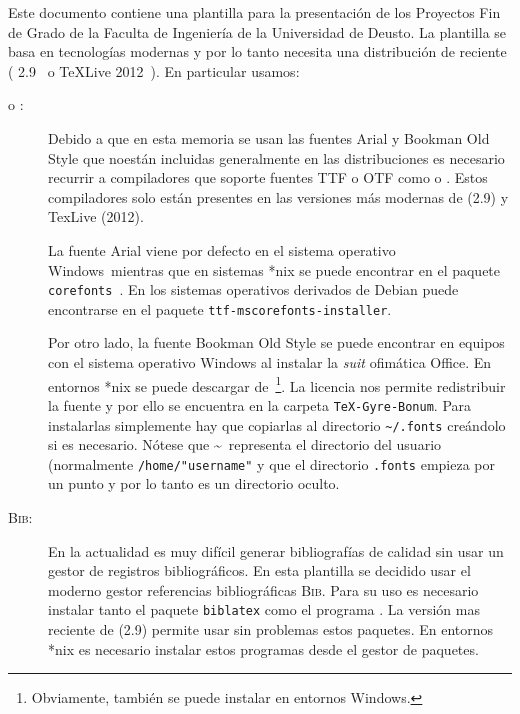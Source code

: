 \documentclass{DeustoFDP}
\begin{document}
Este documento contiene una plantilla para la presentaci\'on de los Proyectos
Fin de Grado de la Faculta de Ingenier\'ia de la Universidad de Deusto. La
plantilla se basa en tecnolog\'ias modernas y por lo tanto necesita una
distribuci\'on de  reciente ( 2.9~\cite{miktex} o
TeXLive 2012~\cite{texlive}). En particular usamos:
\begin{description}
  \item[ o :] Debido a que en esta memoria se
    usan las fuentes Arial y Bookman Old Style que noest\'an incluidas generalmente en
    las distribuciones  es necesario recurrir a compiladores que
    soporte fuentes TTF o OTF como  o .
    Estos compiladores solo est\'an presentes en las versiones m\'as modernas de
     (2.9) y TexLive (2012).

    La fuente Arial viene por defecto en el sistema operativo Windows\textregistered\
    mientras que en sistemas *nix se puede encontrar en el paquete
    \texttt{corefonts}~\cite{corefonts}. En los sistemas operativos derivados
    de Debian puede encontrarse en el paquete \texttt{ttf-mscorefonts-installer}.

    Por otro lado, la fuente Bookman Old Style se puede encontrar en equipos con
    el sistema operativo Windows al instalar la \emph{suit} ofim\'atica
    Office\textregistered. En entornos *nix se puede descargar
    de~\cite{fuente}\footnote{Obviamente, tambi\'en se puede instalar
    en entornos Windows\textregistered.}. La licencia nos permite redistribuir
    la fuente y por ello se encuentra en la carpeta \texttt{TeX-Gyre-Bonum}.
    Para instalarlas simplemente hay que copiarlas al directorio
    \verb+~/.fonts+ cre\'andolo si es necesario. N\'otese que \textasciitilde\ representa el
    directorio del usuario (normalmente \verb+/home/"username"+ y que el directorio
    \verb+.fonts+ empieza por un punto y por lo tanto es un directorio oculto.

  \item[\textsc{Bib}:] En la actualidad es muy dif\'icil generar
    bibliograf\'ias de calidad sin usar un gestor de registros bibliogr\'aficos.
    En esta plantilla se decidido usar el moderno gestor referencias
    bibliogr\'aficas \textsc{Bib}\hologo{LaTeX}. Para su uso es necesario instalar
    tanto el paquete \texttt{biblatex} como el programa \hologo{biber}.
    La versi\'on mas reciente de \hologo{MiKTeX} (2.9) permite usar sin problemas
    estos paquetes. En entornos *nix es necesario instalar estos programas desde
    el gestor de paquetes.


\end{description}
\end{document}

